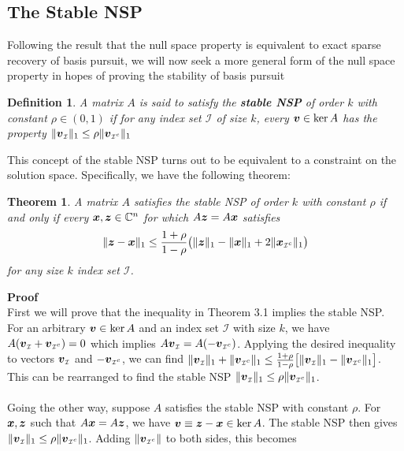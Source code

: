 \documentclass[twocolumn]{gwclass}
\newtheorem{theorem}{Theorem}[section]
\newtheorem{definition}{Definition}
\newcommand{\C}{\mathbb{C}}
\begin{document}
	\subsection{The Stable NSP}
	Following the result that the null space property is equivalent to exact sparse recovery of basis pursuit, we will now seek a more general form of the null space property in hopes of proving the stability of basis pursuit
	\begin{definition}
		A matrix $A$ is said to satisfy the \textbf{stable NSP} of order $k$ with constant $\rho\in(0,1)$ if for any index set $\mathcal{I}$ of size $k$, every $\boldsymbol{v}\in\ker A$ has the property $\|\boldsymbol{v}_{\scriptscriptstyle\mathcal{I}}\|_1 \leq \rho \|\boldsymbol{v}_{\scriptscriptstyle\mathcal{I}^c}\|_1$
	\end{definition}
	This concept of the stable NSP turns out to be equivalent to a constraint on the solution space. Specifically, we have the following theorem:
	\begin{theorem}
		A matrix $A$ satisfies the stable NSP of order $k$ with constant $\rho$ if and only if every $\*x,\*z\in\C^n$ for which $A\boldsymbol{z}=A\boldsymbol{x}$ satisfies
		$$ \|\boldsymbol{z} - \boldsymbol{x}\|_1 \leq \frac{1+\rho}{1-\rho}\big( \|\boldsymbol{z}\|_1 - \|\boldsymbol{x}\|_1 + 2\|\boldsymbol{x}_{\scriptscriptstyle\mathcal{I}^c}\|_1 \big) $$
		for any size $k$ index set $\mathcal{I}$.
\end{theorem}
	\noindent \textbf{Proof}\\
	First we will prove that the inequality in Theorem 3.1 implies the stable NSP. For an arbitrary $\boldsymbol{v}\in\ker A$ and an index set $\mathcal{I}$ with size $k$, we have $A(\boldsymbol{v}_{\scriptscriptstyle\mathcal{I}} + \boldsymbol{v}_{\scriptscriptstyle\mathcal{I}^c})=0$ which implies $A\boldsymbol{v}_{\scriptscriptstyle\mathcal{I}} = A(-\boldsymbol{v}_{\scriptscriptstyle\mathcal{I}^c})$. Applying the desired inequality to vectors $\boldsymbol{v}_{\scriptscriptstyle\mathcal{I}}$ and $-\boldsymbol{v}_{\scriptscriptstyle\mathcal{I}^c}$, we can find $\|\boldsymbol{v}_{\scriptscriptstyle\mathcal{I}}\|_1 + \|\boldsymbol{v}_{\scriptscriptstyle\mathcal{I}^c}\|_1 \leq \frac{1+\rho}{1-\rho}\big[ \|\boldsymbol{v}_{\scriptscriptstyle\mathcal{I}}\|_1 - \|\boldsymbol{v}_{\scriptscriptstyle\mathcal{I}^c}\|_1 \big]$. This can be rearranged to find the stable NSP $\|\boldsymbol{v}_{\scriptscriptstyle\mathcal{I}}\|_1 \leq \rho \|\boldsymbol{v}_{\scriptscriptstyle\mathcal{I}^c}\|_1$.
	\\
	\\
	Going the other way, suppose $A$ satisfies the stable NSP with constant $\rho$. For $\boldsymbol{x},\boldsymbol{z}$ such that $A\boldsymbol{x}=A\boldsymbol{z}$, we have $\boldsymbol{v}\equiv\boldsymbol{z}-\boldsymbol{x}\in\ker A$. The stable NSP then gives $\|\boldsymbol{v}_{\scriptscriptstyle\mathcal{I}}\|_1 \leq \rho \|\boldsymbol{v}_{\scriptscriptstyle\mathcal{I}^c}\|_1$. Adding $\|\boldsymbol{v}_{\scriptscriptstyle\mathcal{I}^c}\|$ to both sides, this becomes
\end{document}
